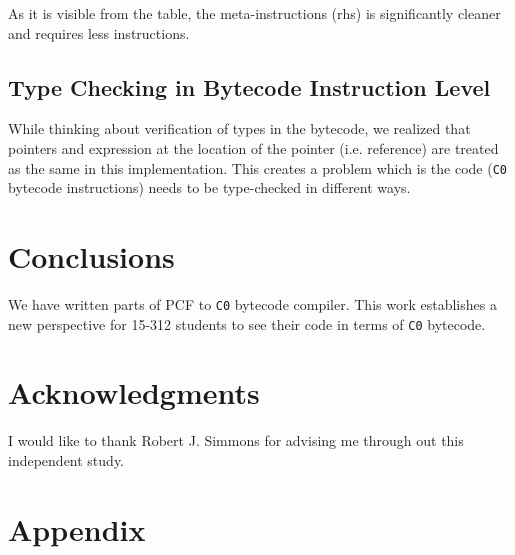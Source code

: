 \documentclass{acm_proc_article-sp}
\newcommand{\ccb}{\texttt{C0} bytecode }
\newcommand{\m}[1]{\texttt{#1}}
\newcommand{\ccbi}{\texttt{C0} bytecode}
\begin{document}
As it is visible from the table, the meta-instructions (rhs) is significantly cleaner and requires less instructions.

\subsection{Type Checking in Bytecode Instruction Level}
While thinking about verification of types in the bytecode, we realized that pointers and expression at the location of the pointer (i.e. reference) are treated as the same in this implementation. This creates a problem which is the code (\ccb instructions) needs to be type-checked in different ways.

%
%
%
%

\section{Conclusions}
We have written parts of PCF to \ccb compiler. This work establishes a new perspective for 15-312 students to see their code in terms of \ccbi.

\section{Acknowledgments}
I would like to thank Robert J. Simmons for advising me through out this independent study.
\section{Appendix}


\nocite{*}

{}
\end{document}
